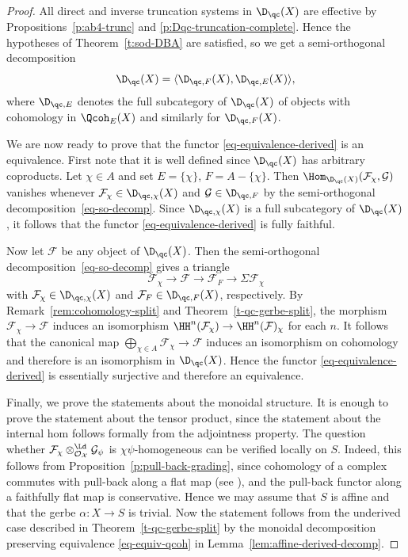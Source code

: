 \begin{proof}
All direct and inverse truncation systems in $\D_\qc(X)$ are
effective by Propositions~\ref{p:ab4-trunc} and \ref{p:Dqc-truncation-complete}.
Hence the hypotheses of Theorem~\ref{t:sod-DBA} are satisfied,
so we get a semi-orthogonal decomposition
\begin{equation}
\label{eq-so-decomp}
\D_\qc(X) = \langle \D_{\qc, F}(X), \D_{\qc, E}(X)\rangle,
\end{equation}
where $\D_{\qc, E}$ denotes the full subcategory of $\D_\qc(X)$ of objects with cohomology in
$\Qcoh_E(X)$ and similarly for $\D_{\qc, F}(X)$.

We are now ready to prove that the functor \eqref{eq-equivalence-derived} is an equivalence.
First note that it is well defined since $\D_\qc(X)$ has arbitrary coproducts.
Let $\chi \in A$ and set
$E = \{\chi\}$, $F = A -\{\chi\}$.
Then $\Hom_{\D_\qc(X)}(\mathcal{F}_\chi, \mathcal{G})$ vanishes
whenever $\mathcal{F}_\chi \in \D_{\qc, \chi}(X)$
and $\mathcal{G} \in \D_{\qc, F}$ by the 
semi-orthogonal decomposition~\eqref{eq-so-decomp}.
Since $\D_{\qc, \chi}(X)$ is a full subcategory of $\D_\qc(X)$,
it follows that the functor \eqref{eq-equivalence-derived} is fully faithful.

Now let $\mathcal{F}$ be any object of $\D_\qc(X)$.
Then the semi-orthogonal decomposition~\eqref{eq-so-decomp}
gives a triangle
$$
\mathcal{F}_\chi \to \mathcal{F} \to \mathcal{F}_F \to \Sigma\mathcal{F}_\chi
$$
with $\mathcal{F}_\chi \in \D_{\qc, \chi}(X)$ and $\mathcal{F}_F
\in \D_{\qc, F}(X)$, respectively.
By Remark~\ref{rem:cohomology-split} 
and Theorem~\ref{t-qc-gerbe-split},
the morphism $\mathcal{F}_\chi \to \mathcal{F}$ induces an isomorphism
$\HH^n(\mathcal{F}_\chi) \to \HH^n(\mathcal{F})_\chi$ for each $n$.
It follows that the canonical map $\bigoplus_{\chi \in A} \mathcal{F}_\chi \to \mathcal{F}$ induces
an isomorphism on cohomology and therefore is an isomorphism in $\D_\qc(X)$.
Hence the functor \eqref{eq-equivalence-derived} is essentially
surjective and therefore an equivalence. 

Finally, we prove the statements about the monoidal structure.
It is enough to prove the statement about the tensor product,
since the statement about the internal hom follows formally from the
adjointness property.
The question whether $\mathcal{F}_\chi \otimes_\mathcal{O_X}^\Ld \mathcal{G}_\psi$
is $\chi\psi$-homogeneous can be verified locally on $S$.
Indeed, this follows from Proposition~\ref{p:pull-back-grading},
since cohomology of a complex commutes with pull-back along a flat map (see \cite[Equation~1.9]{hr2017}),
and the pull-back functor along a faithfully flat map is conservative.
Hence we may assume that $S$ is affine and that the gerbe $\alpha\colon X \to S$
is trivial.
Now the statement follows from the underived case described in Theorem~\ref{t-qc-gerbe-split}
by the monoidal decomposition preserving
equivalence \eqref{eq-equiv-qcoh} in Lemma~\ref{lem:affine-derived-decomp}.
\end{proof}

